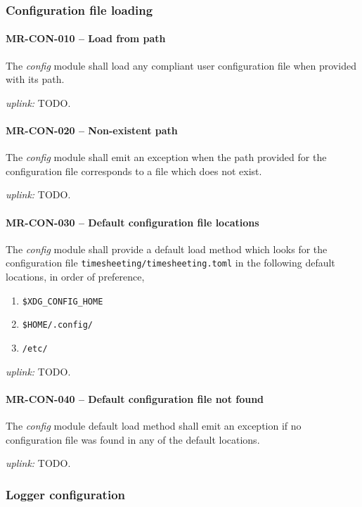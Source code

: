 \subsubsection{Configuration file loading}

\paragraph{MR-CON-010 -- Load from path}
The \emph{config} module shall load any compliant user configuration file when
provided with its path.

\textit{uplink: } TODO.

\paragraph{MR-CON-020 -- Non-existent path}
The \emph{config} module shall emit an exception when the path provided for the
configuration file corresponds to a file which does not exist.

\textit{uplink: } TODO.

\paragraph{MR-CON-030 -- Default configuration file locations}
The \emph{config} module shall provide a default load method which looks
for the configuration file \lstinline{timesheeting/timesheeting.toml}
in the following default locations, in order of preference,
\begin{enumerate}
  \item \lstinline{$XDG_CONFIG_HOME}
  \item \lstinline{$HOME/.config/}
  \item \lstinline{/etc/}
\end{enumerate}

\textit{uplink: } TODO.

\paragraph{MR-CON-040 -- Default configuration file not found}
The \emph{config} module default load method shall emit an exception if
no configuration file was found in any of the default locations.

\textit{uplink: } TODO.

\subsubsection{Logger configuration}
